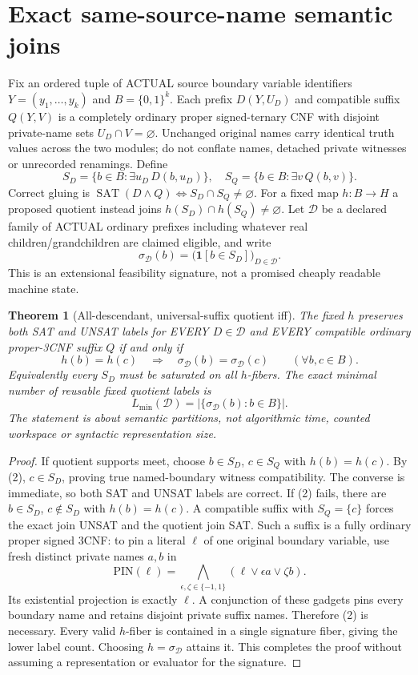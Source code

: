 \documentclass[11pt]{article}
\newtheorem{theorem}{Theorem}
\newcommand{\SAT}{\operatorname{SAT}}
\begin{document}
\section{Exact same-source-name semantic joins}
Fix an ordered tuple of ACTUAL source boundary variable identifiers
$Y=(y_1,\ldots,y_k)$ and $B=\{0,1\}^k$. Each prefix $D(Y,U_D)$
and compatible suffix $Q(Y,V)$ is a completely ordinary proper
signed-ternary CNF with disjoint private-name sets $U_D\cap V=\varnothing$.
Unchanged original names carry identical truth values across the two
modules; do not conflate names, detached private witnesses or
unrecorded renamings. Define
\[
 S_D=\{b\in B:\exists u_D\,D(b,u_D)\},\quad
 S_Q=\{b\in B:\exists v\,Q(b,v)\}.
\]
Correct gluing is $\SAT(D\land Q)\iff S_D\cap S_Q\ne\varnothing$.
For a fixed map $h:B\to H$ a proposed quotient instead joins
$h(S_D)\cap h(S_Q)\ne\varnothing$. Let $\mathcal D$ be a
declared family of ACTUAL ordinary prefixes including whatever real
children/grandchildren are claimed eligible, and write
\[
 \sigma_{\mathcal D}(b)=
 \bigl(\mathbf1[b\in S_D]\bigr)_{D\in\mathcal D}.       \tag{1}
\]
This is an extensional feasibility signature, not a promised
cheaply readable machine state.

\begin{theorem}[All-descendant, universal-suffix quotient iff]\label{th:all}
The fixed $h$ preserves both SAT and UNSAT labels for EVERY
$D\in\mathcal D$ and EVERY compatible ordinary proper-3CNF suffix $Q$
if and only if
\[
 h(b)=h(c)\quad\Longrightarrow\quad
 \sigma_{\mathcal D}(b)=\sigma_{\mathcal D}(c)
 \qquad(\forall b,c\in B).                             \tag{2}
\]
Equivalently every $S_D$ must be saturated on all $h$-fibers.
The exact minimal number of reusable fixed quotient labels is
\[
 L_{\min}(\mathcal D)=
       |\{\sigma_{\mathcal D}(b):b\in B\}|.               \tag{3}
\]
The statement is about semantic partitions, not algorithmic
time, counted workspace or syntactic representation size.
\end{theorem}
\begin{proof}
If quotient supports meet, choose $b\in S_D$, $c\in S_Q$ with
$h(b)=h(c)$. By (2), $c\in S_D$, proving true named-boundary
witness compatibility. The converse is immediate, so both
SAT and UNSAT labels are correct. If (2) fails, there are
$b\in S_D$, $c\notin S_D$ with $h(b)=h(c)$.
A compatible suffix with $S_Q=\{c\}$ forces the exact
join UNSAT and the quotient join SAT. Such a suffix
is a fully ordinary proper signed 3CNF: to pin a literal
$\ell$ of one original boundary variable, use fresh
distinct private names $a,b$ in
\[
  \mathrm{PIN}(\ell)=
  \bigwedge_{\epsilon,\zeta\in\{-1,1\}}
     (\ell\vee\epsilon a\vee\zeta b).                  \tag{4}
\]
Its existential projection is exactly $\ell$. A
conjunction of these gadgets pins every boundary name
and retains disjoint private suffix names. Therefore (2)
is necessary. Every valid $h$-fiber is contained in a
single signature fiber, giving the lower label count.
Choosing $h=\sigma_{\mathcal D}$ attains it. This completes
the proof without assuming a representation or evaluator
for the signature.
\end{proof}
\end{document}

